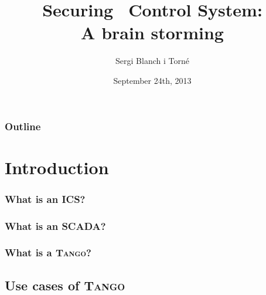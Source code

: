 \documentclass{beamer}
\title[Securing \tango\, Control System]{Securing \tango\, Control System:\\ A brain storming}
\author[Sergi Blanch-Torn\'e]{Sergi Blanch i Torn\'e}
\institute[Universidad de Lleida]{Criptograf\'{\i}a y Grafos\\ Departamento de Matem\'aticas\\ Universidad de Lleida}
\date{September 24th, 2013}
\newcommand{\tango}{\textsc{Tango}}
\newcommand{\corba}{\textsc{Corba}}
\newcommand{\onmiORB}{\textsc{omniORB}}
\newcommand{\zmq}{\textsc{$\varnothing$mq}}
\newcommand{\mysql}{\textsc{MySQL}}
\newcommand{\sardana}{\textsc{Sardana}}
\newcommand{\atk}{\textsc{Atk}}
\newcommand{\taurus}{\textsc{Taurus}}
\begin{document}
\begin{frame}
  \titlepage
\end{frame}

\begin{frame}
\frametitle{Outline}
\tableofcontents[hideallsubsections]
\end{frame}

\section{Introduction}

\begin{frame}
\frametitle{What is an ICS?}
\end{frame}

\begin{frame}
\frametitle{What is an SCADA?}
\end{frame}

\begin{frame}
\frametitle{What is a \tango?}
\end{frame}

\subsection{Use cases of \tango}
\end{document}
